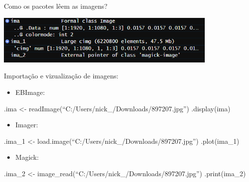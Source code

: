 \documentclass[
  ignorenonframetext,
]{beamer}
\providecommand{\tightlist}{%
  \setlength{\itemsep}{0pt}\setlength{\parskip}{0pt}}
\begin{document}
\begin{frame}{Como os pacotes lêem as imagens?}
\protect\hypertarget{como-os-pacotes-luxeaem-as-imagens}{}

\small

\includegraphics[width=4.3in]{IMAGENS/R_le}

\begin{center}
\tiny{}
\end{center}

\end{frame}

\begin{frame}{Importação e vizualização de imagens:}
\protect\hypertarget{importauxe7uxe3o-e-vizualizauxe7uxe3o-de-imagens}{}

\small

\begin{itemize}
\tightlist
\item
  EBImage:
\end{itemize}

.ima \textless- readImage(``C:/Users/nick\_/Downloads/897207.jpg'')
.display(ima)

\begin{itemize}
\tightlist
\item
  Imager:
\end{itemize}

.ima\_1 \textless- load.image(``C:/Users/nick\_/Downloads/897207.jpg'')
.plot(ima\_1)

\begin{itemize}
\tightlist
\item
  Magick:
\end{itemize}

.ima\_2 \textless- image\_read(``C:/Users/nick\_/Downloads/897207.jpg'')
.print(ima\_2)

\end{frame}
\end{document}
